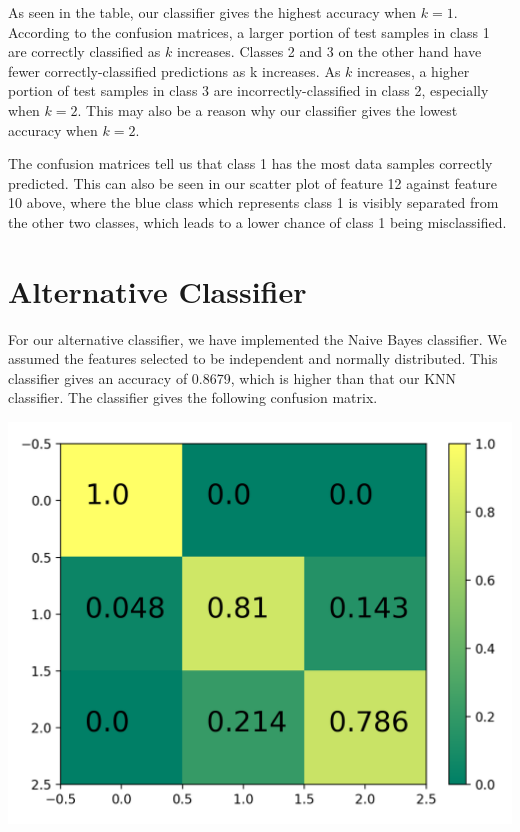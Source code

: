\documentclass[11pt]{article}
\begin{document}
As seen in the table, our classifier gives the highest accuracy when $k = 1$. According to the confusion matrices, a larger portion of test samples in class 1 are correctly classified as $k$ increases. Classes 2 and 3 on the other hand have fewer correctly-classified predictions as k increases. As $k$ increases, a higher portion of test samples in class 3 are incorrectly-classified in class 2, especially when $k = 2$. This may also be a reason why our classifier gives the lowest accuracy when $k = 2$.

The confusion matrices tell us that class 1 has the most data samples correctly predicted. This can also be seen in our scatter plot of feature 12 against feature 10 above, where the blue class which represents class 1 is visibly separated from the other two classes, which leads to a lower chance of class 1 being misclassified.

\section{Alternative Classifier}
For our alternative classifier, we have implemented the Naive Bayes classifier. We assumed the features selected to be independent and normally distributed. This classifier gives an accuracy of 0.8679, which is higher than that our KNN classifier. The classifier gives the following confusion matrix.

\begin{center}
\includegraphics[scale=0.2]{naive_bayes_matrix}
\end{center}
\end{document}
